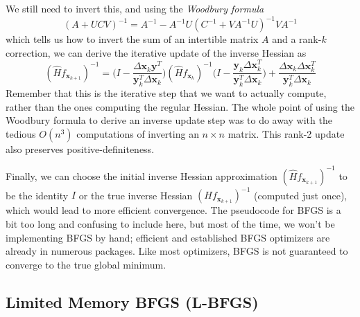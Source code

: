   We still need to invert this, and using the \textit{Woodbury formula}
  \[(A + U C V)^{-1} = A^{-1} - A^{-1} U (C^{-1} + V A^{-1} U)^{-1} V A^{-1}\]
  which tells us how to invert the sum of an intertible matrix $A$ and a rank-$k$ correction, we can derive the iterative update of the inverse Hessian as 
  \[(\hat{H} f_{\mathbf{x}_{k+1}})^{-1} = \bigg( I - \frac{\Delta \mathbf{x}_k \mathbf{y}^T}{\mathbf{y}_k^T \Delta \mathbf{x}_k}\bigg) (\hat{H} f_{\mathbf{x}_{k}})^{-1} \bigg( I - \frac{\mathbf{y}_k \Delta \mathbf{x}_k^T}{\mathbf{y}_k^T \Delta \mathbf{x}_k}\bigg) + \frac{\Delta \mathbf{x}_k \Delta \mathbf{x}_k^T}{\mathbf{y}_k^T \Delta \mathbf{x}_k}\]
  Remember that this is the iterative step that we want to actually compute, rather than the ones computing the regular Hessian. The whole point of using the Woodbury formula to derive an inverse update step was to do away with the tedious $O(n^3)$ computations of inverting an $n \times n$ matrix. This rank-2 update also preserves positive-definiteness. 

  Finally, we can choose the initial inverse Hessian approximation $(\hat{H} f_{\mathbf{x}_{k+1}})^{-1}$ to be the identity $I$ or the true inverse Hessian $(H f_{\mathbf{x}_{k+1}})^{-1}$ (computed just once), which would lead to more efficient convergence. The pseudocode for BFGS is a bit too long and confusing to include here, but most of the time, we won't be implementing BFGS by hand; efficient and established BFGS optimizers are already in numerous packages. Like most optimizers, BFGS is not guaranteed to converge to the true global minimum. 

\subsection{Limited Memory BFGS (L-BFGS)}



